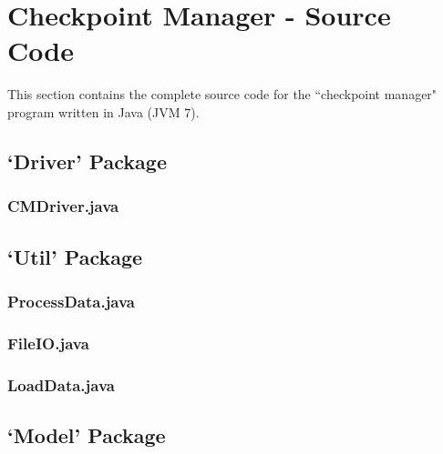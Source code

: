 \documentclass[a4paper, 12pt]{article}
\begin{document}


\clearpage
\section{Checkpoint Manager - Source Code}
This section contains the complete source code for the ``checkpoint manager" program written in Java (JVM 7).

\subsection{`Driver' Package}

\subsubsection{CMDriver.java}


\subsection{`Util' Package}

\subsubsection{ProcessData.java}


\subsubsection{FileIO.java}


\subsubsection{LoadData.java}


\clearpage
\subsection{`Model' Package}
\end{document}
